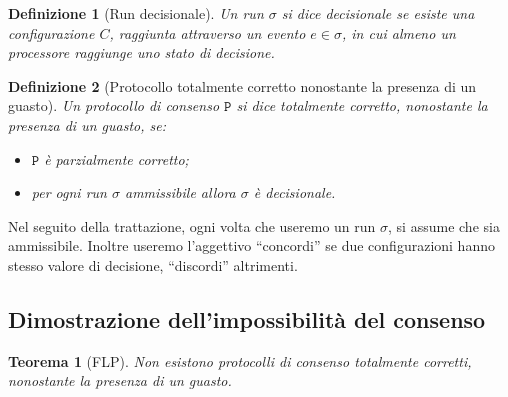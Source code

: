 \documentclass{article}
\newtheorem{definizione}{Definizione}
\newtheorem{teorema}{Teorema}
\begin{document}
\begin{definizione}[Run decisionale]
  Un run $\sigma$ si dice \emph{decisionale} se esiste una
  configurazione $C$, raggiunta attraverso un evento $e\in \sigma$, in cui
  almeno un processore raggiunge uno stato di decisione.
\end{definizione}

\begin{definizione}[Protocollo totalmente corretto nonostante la presenza di un guasto]
  Un protocollo di consenso $\mathtt{P}$ si dice \emph{totalmente corretto},
  nonostante la presenza di un guasto, se:
\begin{itemize}
\item  $\mathtt{P}$ è parzialmente corretto;
\item per ogni run $\sigma$ ammissibile allora $\sigma$ è decisionale.
\end{itemize}
\end{definizione}

Nel seguito della trattazione, ogni volta che useremo un run $\sigma$,
si assume che sia ammissibile. Inoltre useremo l'aggettivo
``concordi'' se due configurazioni hanno stesso valore di decisione,
``discordi'' altrimenti.

\subsection{Dimostrazione dell'impossibilit\`a del consenso}

\begin{teorema}[FLP]
Non esistono protocolli di consenso totalmente corretti, nonostante la presenza di un guasto.
\end{teorema}
\end{document}
